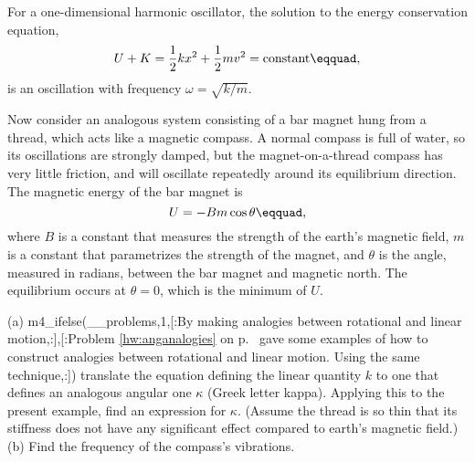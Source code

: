 For a one-dimensional harmonic oscillator, the solution to the
energy conservation equation,
\begin{equation*}
        U+K = \frac{1}{2}kx^2+\frac{1}{2}mv^2 = \text{constant}\eqquad,
\end{equation*}
is an oscillation with frequency $\omega=\sqrt{k/m}$.  

\noindent Now consider an analogous system consisting of a bar magnet hung from a thread,
which acts like a magnetic compass. A normal
compass is full of water, so its oscillations are strongly damped, but the
magnet-on-a-thread compass has very little friction, and will oscillate repeatedly
around its equilibrium direction. The magnetic energy of the bar magnet
is
\begin{equation*}
        U = -Bm\cos\theta\eqquad,
\end{equation*}
where $B$ is a constant that measures the strength of the earth's magnetic field,
$m$ is a constant that parametrizes the strength of the magnet, and
$\theta$ is the angle, measured in radians, 
between the bar magnet and magnetic north. The equilibrium
occurs at $\theta=0$, which is the minimum of $U$.

\noindent (a)
m4_ifelse(__problems,1,[:By making analogies between
rotational and linear motion,:],[:Problem \ref{hw:anganalogies} on p.~\pageref{hw:anganalogies}
gave some examples of how to construct
analogies between rotational and linear motion. 
Using the same technique,:])
translate the
equation defining the linear quantity $k$ to one that defines an analogous angular
one $\kappa$ (Greek letter kappa). Applying this to the present example, find an
expression for $\kappa$.
(Assume the thread is so thin that its stiffness does not have any significant
effect compared to earth's magnetic field.)\hwendpart
(b) Find the frequency of the compass's vibrations.
